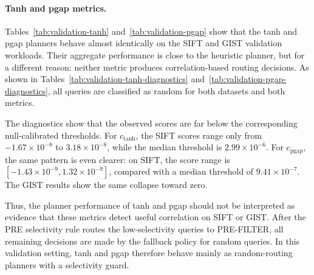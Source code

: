 \begin{table}[H]
    \centering
    \renewcommand{\arraystretch}{1.12}
    \caption{Planner diagnostics for \(c_{\mathrm{heur}}\) on the validation sets.}
    \label{tab:validation-heuristic-diagnostics}
\end{table}

\paragraph{Tanh and pgap metrics.}

Tables~\ref{tab:validation-tanh} and~\ref{tab:validation-pgap} show that the tanh and pgap planners behave almost identically on the SIFT and GIST validation workloads.
Their aggregate performance is close to the heuristic planner, but for a different reason: neither metric produces correlation-based routing decisions.
As shown in Tables~\ref{tab:validation-tanh-diagnostics} and~\ref{tab:validation-pgap-diagnostics}, all queries are classified as random for both datasets and both metrics.

The diagnostics show that the observed scores are far below the corresponding null-calibrated thresholds.
For \(c_{\mathrm{tanh}}\), the SIFT scores range only from \(-1.67 \times 10^{-8}\) to \(3.18 \times 10^{-8}\), while the median threshold is \(2.99 \times 10^{-6}\).
For \(c_{\mathrm{pgap}}\), the same pattern is even clearer: on SIFT, the score range is \([-1.43 \times 10^{-9}, 1.32 \times 10^{-9}]\), compared with a median threshold of \(9.41 \times 10^{-7}\).
The GIST results show the same collapse toward zero.

Thus, the planner performance of tanh and pgap should not be interpreted as evidence that these metrics detect useful correlation on SIFT or GIST.
After the PRE selectivity rule routes the low-selectivity queries to PRE-FILTER, all remaining decisions are made by the fallback policy for random queries.
In this validation setting, tanh and pgap therefore behave mainly as random-routing planners with a selectivity guard.

